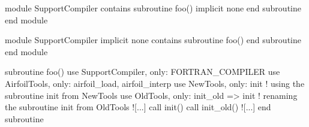 \documentclass{article}
\begin{document}
\begin{codea}
module SupportCompiler
contains
  subroutine foo()
    implicit none
  end subroutine
end module 
\end{codea}
\begin{codea}
module SupportCompiler
  implicit none
contains
  subroutine foo()
  end subroutine
end module 
\end{codea}

\begin{codefull}
subroutine foo()
  use SupportCompiler, only: FORTRAN_COMPILER
  use AirfoilTools, only: airfoil_load, airfoil_interp
  use NewTools, only: init             ! using    the subroutine init from NewTools
  use OldTools, only: init_old => init ! renaming the subroutine init from OldTools
  ![...]
  call init()
  call init_old()
  ![...]
end subroutine 
\end{codefull}




\end{document}
